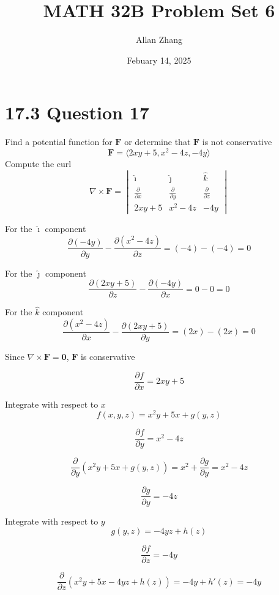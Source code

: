 \documentclass[hidelinks]{article}
\title{\textbf{MATH 32B Problem Set 6}}
\author{Allan Zhang}
\date{Febuary 14, 2025}
\begin{document}
\hypersetup{bookmarksnumbered=true,}
\pagecolor{white}
\color{black}
\maketitle

\section*{17.3 Question 17}
Find a potential function for $\textbf{F}$ or determine that $\textbf{F}$ is not conservative
\[
    \textbf{F} = \langle 2xy+5, x^2-4z, -4y \rangle
\]
Compute the curl
\[
\nabla \times \mathbf{F} =
\begin{vmatrix}
\hat{\imath} & \hat{\jmath} & \hat{k} \\
\frac{\partial}{\partial x} & \frac{\partial}{\partial y} & \frac{\partial}{\partial z} \\
2xy+5 & x^2-4z & -4y
\end{vmatrix}
\]

For the \(\hat{\imath}\) component
\[
\frac{\partial (-4y)}{\partial y} - \frac{\partial (x^2 - 4z)}{\partial z} = (-4) - (-4) = 0
\]

For the \(\hat{\jmath}\) component
\[
\frac{\partial (2xy+5)}{\partial z} - \frac{\partial (-4y)}{\partial x} = 0 - 0 = 0
\]

For the \(\hat{k}\) component
\[
\frac{\partial (x^2 - 4z)}{\partial x} - \frac{\partial (2xy+5)}{\partial y} = (2x) - (2x) = 0
\]

Since \(\nabla \times \mathbf{F} = \mathbf{0}\), \(\mathbf{F}\) is conservative


\[
\frac{\partial f}{\partial x} = 2xy + 5
\]

Integrate with respect to \( x \)
\[
f(x,y,z) = x^2 y + 5x + g(y,z)
\]

\[
\frac{\partial f}{\partial y} = x^2 - 4z
\]

\[
\frac{\partial}{\partial y} (x^2 y + 5x + g(y,z)) = x^2 + \frac{\partial g}{\partial y} = x^2 - 4z
\]

\[
\frac{\partial g}{\partial y} = -4z
\]

Integrate with respect to \( y \)
\[
g(y,z) = -4yz + h(z)
\]

\[
\frac{\partial f}{\partial z} = -4y
\]

\[
\frac{\partial}{\partial z} (x^2 y + 5x - 4yz + h(z)) = -4y + h'(z) = -4y
\]
\end{document}
